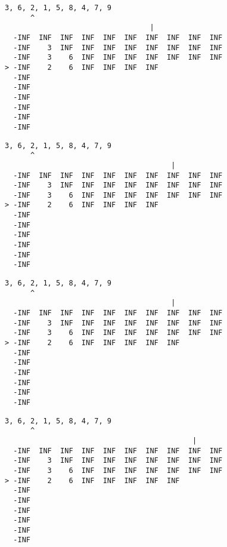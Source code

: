{ \begin{verbatim}
3, 6, 2, 1, 5, 8, 4, 7, 9
      ^
                                  |
  -INF  INF  INF  INF  INF  INF  INF  INF  INF  INF
  -INF    3  INF  INF  INF  INF  INF  INF  INF  INF
  -INF    3    6  INF  INF  INF  INF  INF  INF  INF
> -INF    2    6  INF  INF  INF  INF               
  -INF                                             
  -INF                                             
  -INF                                             
  -INF                                             
  -INF                                             
  -INF                                             
\end{verbatim} }

{ \begin{verbatim}
3, 6, 2, 1, 5, 8, 4, 7, 9
      ^
                                       |
  -INF  INF  INF  INF  INF  INF  INF  INF  INF  INF
  -INF    3  INF  INF  INF  INF  INF  INF  INF  INF
  -INF    3    6  INF  INF  INF  INF  INF  INF  INF
> -INF    2    6  INF  INF  INF  INF               
  -INF                                             
  -INF                                             
  -INF                                             
  -INF                                             
  -INF                                             
  -INF                                             
\end{verbatim} }

{ \begin{verbatim}
3, 6, 2, 1, 5, 8, 4, 7, 9
      ^
                                       |
  -INF  INF  INF  INF  INF  INF  INF  INF  INF  INF
  -INF    3  INF  INF  INF  INF  INF  INF  INF  INF
  -INF    3    6  INF  INF  INF  INF  INF  INF  INF
> -INF    2    6  INF  INF  INF  INF  INF          
  -INF                                             
  -INF                                             
  -INF                                             
  -INF                                             
  -INF                                             
  -INF                                             
\end{verbatim} }

{ \begin{verbatim}
3, 6, 2, 1, 5, 8, 4, 7, 9
      ^
                                            |
  -INF  INF  INF  INF  INF  INF  INF  INF  INF  INF
  -INF    3  INF  INF  INF  INF  INF  INF  INF  INF
  -INF    3    6  INF  INF  INF  INF  INF  INF  INF
> -INF    2    6  INF  INF  INF  INF  INF          
  -INF                                             
  -INF                                             
  -INF                                             
  -INF                                             
  -INF                                             
  -INF                                             
\end{verbatim} }

